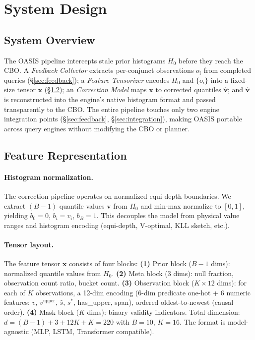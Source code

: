 \documentclass[runningheads]{llncs}
\begin{document}
\section{System Design}
\label{sec:design}
\subsection{System Overview}
The OASIS pipeline intercepts stale prior histograms $H_0$ before they reach the CBO.
A \emph{Feedback Collector} extracts per-conjunct observations $o_i$ from completed
queries (\S\ref{sec:feedback}); a \emph{Feature Tensorizer} encodes $H_0$ and
$\{o_i\}$ into a fixed-size tensor $\mathbf{x}$ (\S\ref{sec:tensor});
an \emph{Correction Model} maps $\mathbf{x}$ to corrected quantiles $\hat{\mathbf{v}}$;
and $\hat{\mathbf{v}}$ is reconstructed into the engine's native histogram format
and passed transparently to the CBO.
The entire pipeline touches only two engine integration points
(\S\ref{sec:feedback}, \S\ref{sec:integration}), making OASIS portable
across query engines without modifying the CBO or planner.

\subsection{Feature Representation}
\label{sec:tensor}
\paragraph{Histogram normalization.}
The correction pipeline operates on normalized equi-depth boundaries.
We extract $(B-1)$ quantile values $\mathbf{v}$ from $H_0$ and min-max
normalize to $[0,1]$, yielding $b_0{=}0$, $b_i{=}v_i$, $b_B{=}1$.
This decouples the model from physical value ranges and histogram encoding
(equi-depth, V-optimal, KLL sketch, etc.).
\paragraph{Tensor layout.}
The feature tensor $\mathbf{x}$ consists of four blocks:
\textbf{(1)} Prior block ($B{-}1$ dims): normalized quantile values from $H_0$.
\textbf{(2)} Meta block (3 dims): null fraction, observation count ratio, bucket count.
\textbf{(3)} Observation block ($K \times 12$ dims): for each of $K$ observations,
a 12-dim encoding (6-dim predicate one-hot + 6 numeric features: $v$, $v^{\text{upper}}$,
$\hat{s}$, $s^*$, has\_upper, span), ordered oldest-to-newest (causal order).
\textbf{(4)} Mask block ($K$ dims): binary validity indicators.
Total dimension: $d = (B{-}1) + 3 + 12K + K = 220$ with $B{=}10$, $K{=}16$.
The format is model-agnostic (MLP, LSTM, Transformer compatible).
\end{document}
